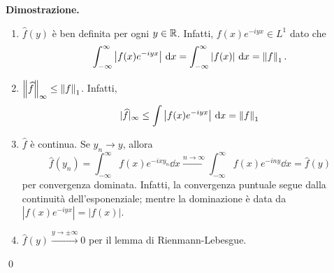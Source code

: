 \textbf{Dimostrazione.} 
\begin{enumerate}

	\item $\hat{f}(y)$ è ben definita per ogni $y \in \mathbb R$. Infatti, $f(x) e^{-iyx} \in L^1$ dato che
	$$
		\int_{-\infty}^\infty \left| f(x) e^{-iyx} \right| \,\mathrm{d} x 
		= \int_{-\infty}^\infty \left| f(x) \right| \,\mathrm{d} x
		= \left\lVert f \right\rVert_1.
	$$


	\item $\left\lVert \widehat{f} \right\rVert_\infty \leq \left\lVert f \right\rVert_1$. Infatti,
	$$
		|\widehat{f}|_\infty \leq \int \left| f(x) e^{-iyx} \right| \,\mathrm{d} x = \left\lVert f \right\rVert_1
	$$


	\item $\hat{f}$ è continua. Se $y_n \to y$, allora
	$$
		\hat{f}(y_n) = \int_{-\infty}^\infty f(x) e^{-ixy_n} \dd x \xrightarrow{n \to \infty}
		\int_{-\infty}^\infty f(x) e^{-iny} \dd x = \hat{f}(y)
	$$
	per convergenza dominata. Infatti, la convergenza puntuale segue dalla continuità dell'esponenziale; mentre la dominazione è data da $|f(x) e^{-iyx}| = |f(x)|$.


	\item $\hat{f}(y) \xrightarrow{y \to \pm \infty} 0$ per il lemma di Rienmann-Lebesgue.

\end{enumerate}
\qed


